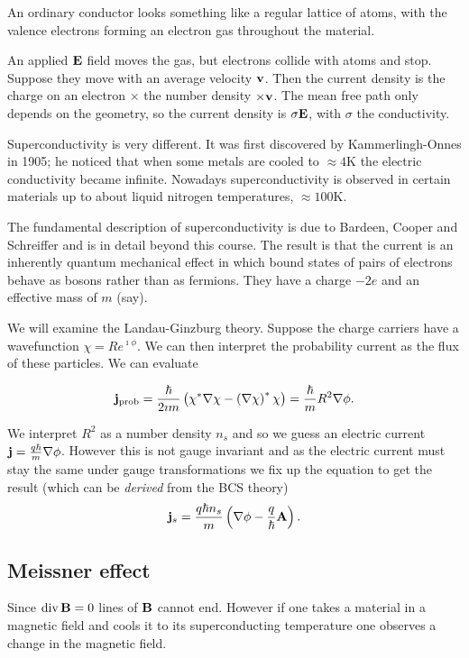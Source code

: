 \documentclass{notes}
\newcommand{\B}{\vect{B}}
\newcommand{\E}{\vect{E}}
\newcommand{\jc}{\vect{j}}
\newcommand{\K}{\mathrm{K}}
\DeclareMathOperator{\dive}{div}
\begin{document}
An ordinary conductor looks something like a regular lattice of atoms, with
the valence electrons forming an electron gas throughout the material.

\vspace{1in}

An applied $\E$ field moves the gas, but electrons collide with atoms
and stop.  Suppose they move with an average velocity $\mathbf{v}$.  Then
the current density is the charge on an electron $\times$ the number
density $\times \mathbf{v}$.  The mean free path only depends on the geometry,
so the current density is $\sigma \E$, with $\sigma$ the conductivity.

Superconductivity is very different.  It was first discovered by
Kammerlingh-Onnes in 1905; he noticed that when some metals are cooled
to $\approx 4 \K$ the electric conductivity became infinite.  Nowadays
superconductivity is observed in certain materials up to about liquid
nitrogen temperatures, $\approx 100 \K$.

The fundamental description of superconductivity is due to Bardeen,
Cooper and Schreiffer and is in detail beyond this course.  The result
is that the current is an inherently quantum mechanical effect in which
bound states of pairs of electrons behave as bosons rather than as fermions.
They have a charge $-2 e$ and an effective mass of $m$ (say).

We will examine the Landau-Ginzburg theory. Suppose the charge
carriers have a wavefunction $\chi = R e^{\imath \phi}$.  We can then
interpret the probability current as the flux of these particles.  We
can evaluate

\[
\jc_{\text{prob}} = \frac{\hbar}{2 \imath m} \left( \chi^\ast \nabla \chi
- \left( \nabla \chi \right)^\ast \chi \right)
= \frac{\hbar}{m} R^2 \nabla \phi.
\]

We interpret $R^2$ as a number density $n_s$ and so we guess an
electric current $\jc = \frac{q \hbar}{m} \nabla \phi$.  However this
is not gauge invariant and as the electric current must stay the same under
gauge transformations we fix up the equation to get the result
(which can be \emph{derived} from the BCS theory)
\[
\jc_s = \frac{q \hbar n_s}{m} \left( \nabla \phi - \frac{q}{\hbar} \vect{A}
\right).
\]

\subsection{Meissner effect}

Since $\dive \B = 0$ lines of $\B$ cannot end.  However if one
takes a material in a magnetic field and cools it to its superconducting
temperature one observes a change in the magnetic field.
\end{document}
